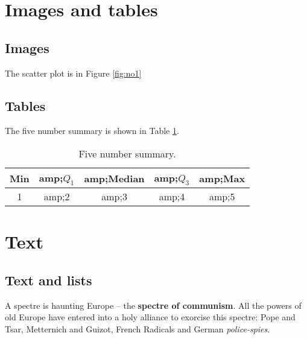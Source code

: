 \documentclass[11pt]{article}
\begin{document}
\section{Images and tables}
\subsection{Images}
The scatter plot is in Figure \ref{fig:no1}    %


\subsection{Tables}
The five number summary is shown in Table \ref{tab:no1}. 

\begin{table}[htp]
\caption{Five number summary.}
\begin{center}
    \begin{tabular}{|c|c|c|c|c|}    %
        \hline
        Min&amp;$Q_1$&amp;Median&amp;$Q_3$&amp;Max\\ \hline
        1&amp;2&amp;3&amp;4&amp;5\\\hline
    \end{tabular}
\end{center}
\label{tab:no1}
\end{table}

\section{Text}
\subsection{Text and lists}
A spectre is haunting Europe -- the {\bf spectre of communism}. %
All the powers of old Europe have entered into a holy alliance to exorcise this spectre: Pope and Tsar, Metternich and Guizot, French Radicals and German {\it police-spies}.    %
\end{document}
